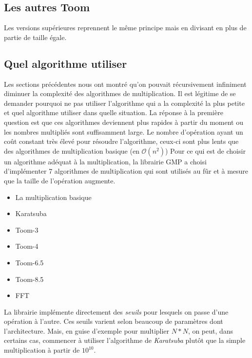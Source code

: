 \documentclass[letterpaper]{article}
\begin{document}
\subsection{Les autres Toom}

Les versions supérieures reprennent le même principe mais en divisant
en plus de partie de taille égale.

\subsection{Quel algorithme utiliser}

Les sections précédentes nous ont montré qu'on pouvait récursivement
infiniment diminuer la complexité des algorithmes de multiplication.
Il est légitime de se demander pourquoi ne pas utiliser l'algorithme
qui a la complexité la plus petite et quel algorithme utiliser dans
quelle situation.
\newline
La réponse à la première question est que ces algorithmes deviennent
plus rapides à partir du moment ou les nombres multipliés sont
suffisamment large. Le nombre d'opération ayant un coût constant
très élevé pour résoudre l'algorithme, ceux-ci sont plus lents
que des algorithmes de multiplication basique (en $\mathcal{O}(n^2)$)
\newline
Pour ce qui est de choisir un algorithme adéquat à la multiplication,
la librairie GMP a choisi d'implémenter 7 algorithmes de multiplication
qui sont utilisés au fûr et à mesure que la taille de l'opération
augmente\cite{gmplibmultiplication}.

\begin{itemize}
  \item La multiplication basique
  \item Karatsuba
  \item Toom-3
  \item Toom-4
  \item Toom-6.5
  \item Toom-8.5
  \item FFT
\end{itemize}

La librairie implémente directement des \emph{seuils} pour lesquels
on passe d'une opération à l'autre. Ces seuils varient selon
beaucoup de paramètres dont l'architecture. Mais, en guise d'exemple
pour multiplier $N*N$, on peut, dans certains cas, commencer à utiliser
l'algorithme de \emph{Karatsuba} plutôt que la simple multiplication
à partir de $10^{10}$\cite{gmplibkaratsuba}.


\footnotesize


\end{document}
